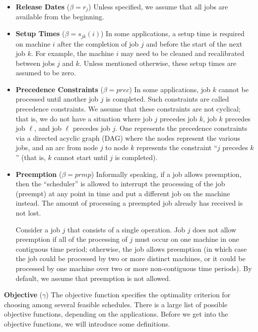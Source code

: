 \begin{itemize}

    \item {\bf Release Dates} ($\beta = r_j$) Unless specified, we assume 
    that all jobs are available from the beginning.

    \item {\bf Setup Times} ($\beta = s_{jk}(i)$) In some applications, a 
    setup time is required on machine $i$ after the completion of job $j$ 
    and before the start of the next job $k$. For example, the machine $i$ 
    may need to be cleaned and recalibrated between jobs $j$ and $k$. Unless
    mentioned otherwise, these setup times are assumed to be zero.

    \item {\bf Precedence Constraints} ($\beta = prec$) In some applications, 
    job $k$ cannot be processed until another job $j$ is completed. Such 
    constraints are called precedence constraints. We assume that these 
    constraints are not cyclical; that is, we do not have a situation
    where job $j$ precedes job $k$, job $k$ precedes job $\ell$, and job 
    $\ell$ precedes job $j$. One represents the precedence constraints via a 
    directed acyclic graph (DAG) where the nodes represent the various jobs, 
    and an arc from node $j$ to node $k$ represents the constraint ``$j$ 
    precedes $k$'' (that is, $k$ cannot start until $j$ is completed).

    \item {\bf Preemption} ($\beta = prmp$) Informally speaking, if a job 
    allows preemption, then the ``scheduler'' is allowed to interrupt the 
    processing of the job (preempt) at any point in time and put a different 
    job on the machine instead. The amount of processing a preempted job 
    already has received is not lost.

    Consider a job $j$ that consists of a single operation. Job $j$ does 
    not allow preemption if all of the processing of $j$ must occur on one 
    machine in one contiguous time period; otherwise, the job allows preemption 
    (in which case the job could be processed by two or more distinct machines,
    or it could be processed by one machine over two or more non-contiguous 
    time periods). By default, we assume that preemption is not allowed. 

\end{itemize}

{\bf Objective} ($\gamma$) The objective function specifies the optimality 
criterion for choosing among several feasible schedules. There is a large list
of possible objective functions, depending on the applications. Before we get 
into the objective functions, we will introduce some definitions.

